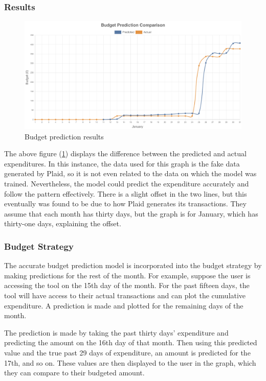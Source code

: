 \subsubsection{Results}
\begin{figure}[H]
	\centering
	\includegraphics[width=\textwidth]{images/Budger_prediction_comparison.png}
	\caption{Budget prediction results}
	\label{fig:BudgetPredictionResults}
\end{figure}

The above figure (\ref{fig:BudgetPredictionResults}) displays the difference between the predicted and actual expenditures. In this instance, the data used for this graph is the fake data generated by Plaid, so it is not even related to the data on which the model was trained. Nevertheless, the model could predict the expenditure accurately and follow the pattern effectively. There is a slight offset in the two lines, but this eventually was found to be due to how Plaid generates its transactions. They assume that each month has thirty days, but the graph is for January, which has thirty-one days, explaining the offset.

\subsubsection{Budget Strategy}
The accurate budget prediction model is incorporated into the budget strategy by making predictions for the rest of the month. For example, suppose the user is accessing the tool on the 15th day of the month. For the past fifteen days, the tool will have access to their actual transactions and can plot the cumulative expenditure. A prediction is made and plotted for the remaining days of the month.

The prediction is made by taking the past thirty days' expenditure and predicting the amount on the 16th day of that month. Then using this predicted value and the true past 29 days of expenditure, an amount is predicted for the 17th, and so on. These values are then displayed to the user in the graph, which they can compare to their budgeted amount.

